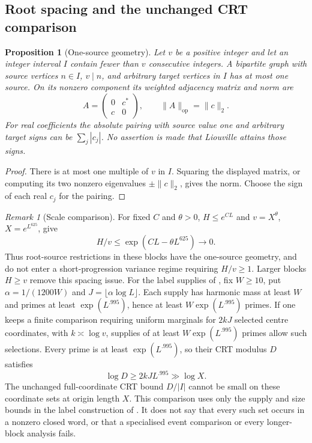 \documentclass[11pt]{article}
\newtheorem{proposition}[theorem]{Proposition}
\theoremstyle{definition}
\theoremstyle{remark}
\newtheorem{remark}[theorem]{Remark}
\numberwithin{equation}{section}
\newcommand{\op}{\mathrm{op}}
\begin{document}
\subsection{Root spacing and the unchanged CRT comparison}
\begin{proposition}[One-source geometry]\label{prop:d-spacing}
Let $v$ be a positive integer and let an integer interval $I$ contain fewer than $v$ consecutive integers.
A bipartite graph with source vertices $n\in I$, $v\mid n$, and arbitrary target vertices in $I$ has
at most one source. On its nonzero component its weighted adjacency matrix and norm are
\begin{equation}\label{eq:d-star}
 A=\begin{pmatrix}0&c^*\\c&0\end{pmatrix},\qquad\|A\|_\op=\|c\|_2.
\end{equation}
For real coefficients the absolute pairing with source value one and arbitrary target signs can be
$\sum_j|c_j|$. No assertion is made that Liouville attains those signs.
\end{proposition}
\begin{proof}
There is at most one multiple of $v$ in $I$. Squaring the displayed matrix, or computing its two
nonzero eigenvalues $\pm\|c\|_2$, gives the norm. Choose the sign of each real $c_j$ for the pairing.
\end{proof}
\begin{remark}[Scale comparison]\label{rem:d-crt}
For fixed $C$ and $\theta>0$, $H\le e^{CL}$ and $v=X^\theta$, $X=e^{L^{625}}$, give
\begin{equation}\label{eq:d-spacing}
 H/v\le\exp(CL-\theta L^{625})\longrightarrow0.
\end{equation}
Thus root-source restrictions in these blocks have the one-source geometry, and do not enter a
short-progression variance regime requiring $H/v\ge1$.
Larger blocks $H\ge v$ remove this spacing issue.
For the label supplies of \cite[Definition~2.6 and Proposition~2.7]{Guo2026RoughPairsFixedDistance},
fix $W\ge10$, put $\alpha=1/(1200W)$ and $J=\lfloor\alpha\log L\rfloor$.
Each supply has harmonic mass at least $W$ and primes at least $\exp(L^{.995})$, hence at least
$W\exp(L^{.995})$ primes. If one keeps a finite comparison requiring uniform
marginals for $2kJ$ selected centre coordinates, with $k\asymp\log v$, supplies of at least
$W\exp(L^{.995})$ primes allow such selections. Every prime is at least $\exp(L^{.995})$, so their
CRT modulus $D$ satisfies
\begin{equation}\label{eq:d-crt-size}
 \log D\ge2kJ L^{.995}\gg\log X.
\end{equation}
The unchanged full-coordinate CRT bound $D/|I|$ cannot be small on these coordinate sets at origin
length $X$. This comparison uses only the supply and size bounds in the label construction of
\cite[Definition~2.6 and Proposition~2.7]{Guo2026RoughPairsFixedDistance}.
It does not say that every such set occurs in a nonzero closed word, or that a specialised event
comparison or every longer-block analysis fails.
\end{remark}
\end{document}

